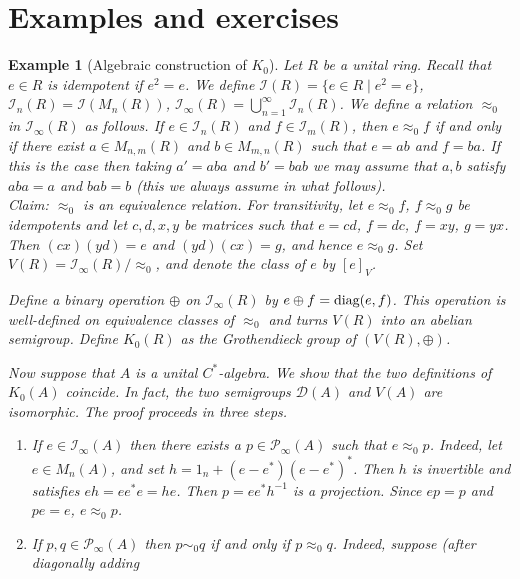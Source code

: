 \documentclass{book}
\newtheorem{example}[definition]{Example}
\def\cstar{\(C^*\)-algebra}
\def\diag{\textnormal{diag}}
\begin{document}
\section{Examples and exercises}
\begin{example}[Algebraic construction of \(K_0\)]\label{ex:3320}
  Let \(R\) be a unital ring. Recall that \(e\in R\) is \textnormal{idempotent}
  if \(e^2=e\). We define \(\mathcal{I}(R)=\{e\in R\mid e^2=e\}\), \(\mathcal{I}_n(R)=\mathcal{I}(M_n(R))\),
  \(\mathcal{I}_\infty(R)=\bigcup_{n=1}^\infty\mathcal{I}_n(R)\).
  We define a relation \(\approx_0\) in \(\mathcal{I}_\infty(R)\) as follows.
  If \(e\in\mathcal{I}_n(R)\) and \(f\in\mathcal{I}_m(R)\), then \(e\approx_0 f\)
  if and only if there exist \(a\in M_{n,m}(R)\) and \(b\in M_{m,n}(R)\) such that \(e=ab\) and \(f=ba\).
  If this is the case then taking \(a'=aba\) and \(b'=bab\) we may assume that \(a,b\) satisfy \(aba=a\)
  and \(bab=b\) (this we always assume in what follows).\\
  Claim: \(\approx_0\) is an equivalence relation. For transitivity,
  let \(e\approx_0 f\), \(f\approx_0 g\) be idempotents and let \(c,d,x,y\) be matrices such that
  \(e=cd\), \(f=dc\), \(f=xy\), \(g=yx\). Then \((cx)(yd)=e\) and \((yd)(cx)=g\), 
  and hence \(e\approx_0 g\). Set \(V(R) = \mathcal{I}_\infty(R)/\approx_0\), and denote the class of \(e\) by \({[e]}_V\).\par
  Define a binary operation \(\oplus\) on \(\mathcal{I}_\infty(R)\) by \(e\oplus f=\diag(e,f)\).
  This operation is well-defined on equivalence classes of \(\approx_0\) and turns \(V(R)\) into an abelian semigroup.
  Define \(K_0(R)\) as the Grothendieck group of \((V(R),\oplus)\).\par
  Now suppose that \(A\) is a unital \cstar. We show that the two definitions of \(K_0(A)\) coincide.
  In fact, the two semigroups \(\mathcal{D}(A)\) and \(V(A)\) are isomorphic. The proof proceeds in three steps.
  \begin{enumerate}
    \item If \(e\in\mathcal{I}_\infty(A)\) then there exists a \(p\in\mathcal{P}_\infty(A)\) such that \(e\approx_0 p\).
      Indeed, let \(e\in M_n(A)\), and set \(h=1_n+(e-e^*)(e-e^*)^*\). Then \(h\) is invertible and satisfies \(eh=ee^* e=he\).
      Then \(p=ee^* h^{-1}\) is a projection. Since \(ep=p\) and \(pe=e\), \(e\approx_0 p\).
    \item If \(p,q\in\mathcal{P}_\infty(A)\) then \(p\sim_0 q\) if and only if \(p\approx_0 q\). Indeed, suppose (after diagonally adding 

\end{enumerate}
\end{example}
\end{document}

